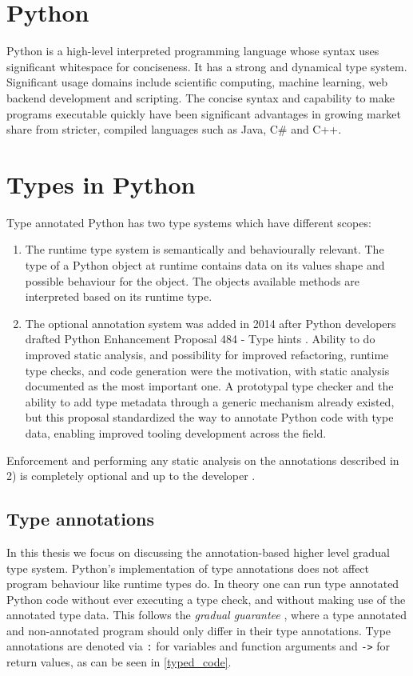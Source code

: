 
\section{Python}
Python is a high-level interpreted programming language whose syntax uses significant whitespace for conciseness. It has a strong and dynamical type system. Significant usage domains include scientific computing, machine learning, web backend development and scripting. The concise syntax and capability to make programs executable quickly have been significant advantages in growing market share from stricter, compiled languages such as Java, C\# and C++.


\section{Types in Python}

Type annotated Python has two type systems which have different scopes:
\begin{enumerate}
    \item The runtime type system is semantically and behaviourally relevant. The type of a Python object at runtime contains data on its values shape and possible behaviour for the object. The objects available methods are interpreted based on its runtime type.
    \item The optional annotation system was added in 2014 after Python developers drafted Python Enhancement Proposal 484 - Type hints \cite{pep_484}. Ability to do improved static analysis, and possibility for improved refactoring, runtime type checks, and code generation were the motivation, with static analysis documented as the most important one. A prototypal type checker and the ability to add type metadata through a generic mechanism already existed, but this proposal standardized the way to annotate Python code with type data, enabling improved tooling development across the field.
\end{enumerate}

Enforcement and performing any static analysis on the annotations described in 2) is completely optional and up to the developer \cite{python_typing}.

\subsection{Type annotations}
In this thesis we focus on discussing the annotation-based higher level gradual type system. Python's implementation of type annotations does not affect program behaviour like runtime types do. In theory one can run type annotated Python code without ever executing a type check, and without making use of the annotated type data. This follows the \emph{gradual guarantee} \cite{siek_refined_gradual_2015}, where a type annotated and non-annotated program should only differ in their type annotations. Type annotations are denoted via {\tt :} for variables and function arguments and {\tt ->} for return values, as can be seen in \ref{typed_code}.


